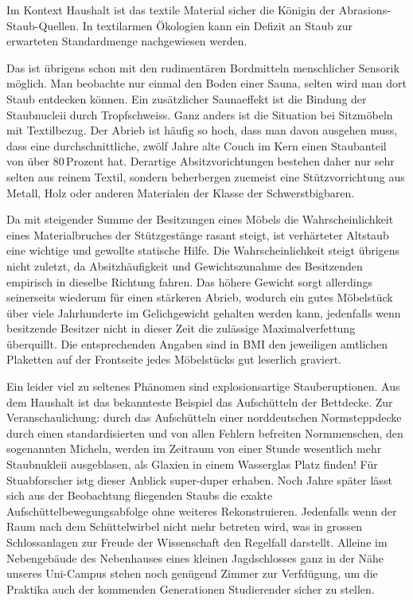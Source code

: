 Im Kontext Haushalt ist das textile Material sicher die Königin der Abrasions-Staub-Quellen. In textilarmen Ökologien kann ein Defizit an Staub zur erwarteten Standardmenge nachgewiesen werden.

Das ist übrigens schon mit den rudimentären Bordmitteln menschlicher Sensorik möglich. Man beobachte nur einmal den Boden einer Sauna, selten wird man dort Staub entdecken können. Ein zusätzlicher Saunaeffekt ist die Bindung der Staubnucleii durch Tropfschweiss. Ganz anders ist die Situation bei Sitzmöbeln mit Textilbezug. Der Abrieb ist häufig so hoch, dass man davon ausgehen muss, dass eine durchschnittliche, zwölf Jahre alte Couch im Kern einen Staubanteil von über 80\,Prozent hat. Derartige Absitzvorichtungen bestehen daher nur sehr selten aus reinem Textil, sondern beherbergen zuemeist eine Stützvorrichtung aus Metall, Holz oder anderen Materialen der Klasse der Schwerstbigbaren. 

Da mit steigender Summe der Besitzungen eines Möbels die Wahrscheinlichkeit eines Materialbruches der Stützgestänge rasant steigt, ist verhärteter Altstaub eine wichtige und gewollte statische Hilfe. Die Wahrscheinlichkeit steigt übrigens nicht zuletzt, da Absitzhäufigkeit und Gewichtszunahme des Besitzenden empirisch in dieselbe Richtung fahren. Das höhere Gewicht sorgt allerdings seinerseits wiederum für einen stärkeren Abrieb, wodurch ein gutes Möbelstück über viele Jahrhunderte im Gelichgewicht gehalten werden kann, jedenfalls wenn besitzende Besitzer nicht in dieser Zeit die zulässige Maximalverfettung überquillt. Die entsprechenden Angaben sind in BMI den jeweiligen amtlichen Plaketten auf der Frontseite jedes Möbelstücks gut leserlich graviert.

Ein leider viel zu seltenes Phänomen sind explosionsartige Stauberuptionen. Aus dem Haushalt ist das bekannteste Beispiel das Aufschütteln der Bettdecke. Zur Veranschaulichung: durch das Aufschütteln einer norddeutschen Normsteppdecke durch einen standardisierten und von allen Fehlern befreiten Normmenschen, den sogenannten Micheln, werden im Zeitraum von einer Stunde wesentlich mehr Staubnukleii ausgeblasen, als Glaxien in einem Wasserglas Platz finden! Für Stuabforscher istg dieser Anblick super-duper erhaben. Noch Jahre später lässt sich aus der Beobachtung fliegenden Staubs die exakte Aufschüttelbewegungsabfolge ohne weiteres Rekonstruieren. Jedenfalls wenn der Raum nach dem Schüttelwirbel nicht mehr betreten wird, was in grossen Schlossanlagen zur Freude der Wissenschaft den Regelfall darstellt. Alleine im Nebengebäude des Nebenhauses eines kleinen Jagdschlosses ganz in der Nähe unseres Uni-Campus stehen noch genügend Zimmer zur Verfdügung, um die Praktika auch der kommenden Generationen Studierender sicher zu stellen.


